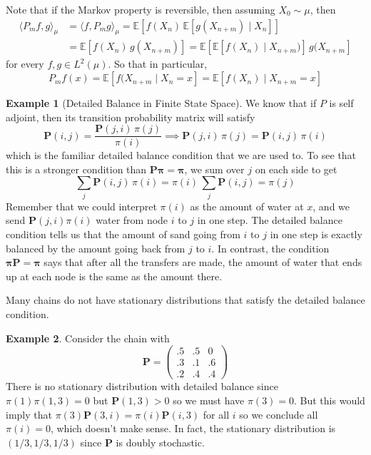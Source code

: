 \documentclass{article}
\theoremstyle{definition}
\newtheorem{example}{Example}[section]
\theoremstyle{remark}
\theoremstyle{definition}
\begin{document}
Note that if the Markov property is reversible, then assuming $X_0 \sim \mu$, then 
\begin{align*}
    \langle P_m f, g \rangle_\mu & = \langle f, P_m g \rangle_\mu = \mathbb{E}[ f(X_n) \, \mathbb{E}[g(X_{n + m}) \mid X_n]] \\
    & = \mathbb{E}[ f(X_n) \, g(X_{n + m})] = \mathbb{E}[ \mathbb{E}[ f(X_n) \mid X_{n + m})] \, g(X_{n + m}] 
\end{align*}
for every $f, g \in L^2 (\mu)$. So that in particular, 
\[P_m f (x) = \mathbb{E}[f(X_{n + m} \mid X_n = x] = \mathbb{E}[f(X_n) \mid X_{n + m} = x]\]

\begin{example}[Detailed Balance in Finite State Space]
We know that if $P$ is self adjoint, then its transition probability matrix will satisfy 
\[\mathbf{P}(i, j) = \frac{\mathbf{P}(j, i) \, \pi(j)}{\pi(i)} \implies \mathbf{P}(j, i) \, \pi(j) = \mathbf{P}(i, j) \, \pi(i)\]
which is the familiar detailed balance condition that we are used to. To see that this is a stronger condition than $\mathbf{P} \boldsymbol{\pi} = \boldsymbol{\pi}$, we sum over $j$ on each side to get 
\[\sum_j \mathbf{P}(i, j) \, \pi(i) = \pi(i) \, \sum_j \mathbf{P}(i, j) = \pi(j)\]
Remember that we could interpret $\pi(i)$ as the amount of water at $x$, and we send $\mathbf{P}(j, i) \pi(i)$ water from node $i$ to $j$ in one step. The detailed balance condition tells us that the amount of sand going from $i$ to $j$ in one step is exactly balanced by the amount going back from $j$ to $i$. In contrast, the condition $\boldsymbol{\pi} \mathbf{P} = \boldsymbol{\pi}$ says that after all the transfers are made, the amount of water that ends up at each node is the same as the amount there. 
\end{example}

Many chains do not have stationary distributions that satisfy the detailed balance condition. 

\begin{example}
Consider the chain with 
\[\mathbf{P} = \begin{pmatrix} .5 & .5 & 0 \\ .3 & .1 & .6 \\ .2 & .4 & .4 \end{pmatrix}\]
There is no stationary distribution with detailed balance since $\pi(1) \pi(1, 3) = 0$ but $\mathbf{P}(1, 3) > 0$ so we must have $\pi(3) = 0$. But this would imply that $\pi(3) \mathbf{P}(3, i) = \pi(i) \mathbf{P}(i, 3)$ for all $i$ so we conclude all $\pi(i) = 0$, which doesn't make sense. In fact, the stationary distribution is $(1/3, 1/3, 1/3)$ since $\mathbf{P}$ is doubly stochastic. 
\end{example}
\end{document}
